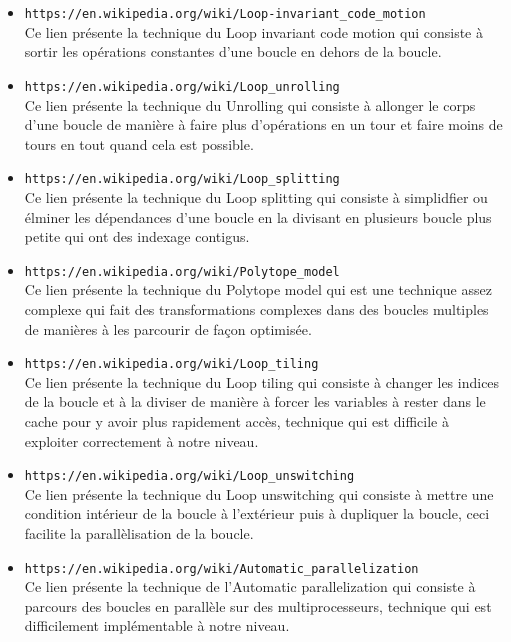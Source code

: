 \documentclass[a4paper]{article}
\begin{document}
\begin{itemize}
\item \texttt{https://en.wikipedia.org/wiki/Loop-invariant\_code\_motion} \\
Ce lien présente la technique du Loop invariant code motion qui consiste à sortir les opérations constantes d'une boucle en dehors de la boucle.\\

\item \texttt{https://en.wikipedia.org/wiki/Loop\_unrolling} \\
Ce lien présente la technique du Unrolling qui consiste à allonger le corps d'une boucle de manière à faire plus d'opérations en un tour et faire moins de tours en tout quand cela est possible.\\

\item \texttt{https://en.wikipedia.org/wiki/Loop\_splitting} \\
Ce lien présente la technique du Loop splitting qui consiste à simplidfier ou élminer les dépendances d'une boucle en la divisant en plusieurs boucle plus petite qui ont des indexage contigus.\\

\item \texttt{https://en.wikipedia.org/wiki/Polytope\_model} \\
Ce lien présente la technique du Polytope model qui est une technique assez complexe qui fait des transformations complexes dans des boucles multiples de manières à les parcourir de façon optimisée.\\

\item \texttt{https://en.wikipedia.org/wiki/Loop\_tiling} \\
Ce lien présente la technique du Loop tiling qui consiste à changer les indices de la boucle et à la diviser de manière à forcer les variables à rester dans le cache pour y avoir plus rapidement accès, technique qui est difficile à exploiter correctement à notre niveau.\\

\item \texttt{https://en.wikipedia.org/wiki/Loop\_unswitching} \\
Ce lien présente la technique du Loop unswitching qui consiste à mettre une condition intérieur de la boucle à l'extérieur puis à dupliquer la boucle, ceci facilite la parallèlisation de la boucle.\\

\item \texttt{https://en.wikipedia.org/wiki/Automatic\_parallelization} \\
Ce lien présente la technique de l'Automatic parallelization qui consiste à parcours des boucles en parallèle sur des multiprocesseurs, technique qui est difficilement implémentable à notre niveau.


\end{itemize}
\end{document}
